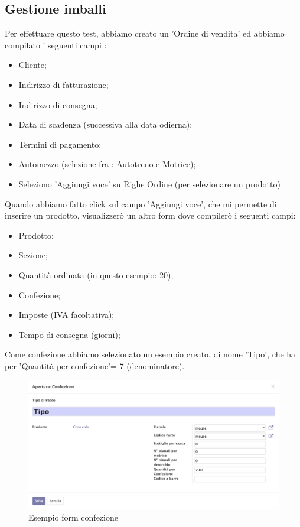 \subsection{Gestione imballi}

Per effettuare questo test, abbiamo creato un 'Ordine di vendita' ed abbiamo compilato i seguenti campi :
\begin{itemize}
	\item Cliente;
	\item Indirizzo di fatturazione;
	\item Indirizzo di consegna;
	\item Data di scadenza (successiva alla data odierna);
	\item Termini di pagamento;
	\item Automezzo (selezione fra : Autotreno e Motrice);
	\item Seleziono 'Aggiungi voce' su Righe Ordine (per selezionare un prodotto)
\end{itemize}

Quando abbiamo fatto click sul campo 'Aggiungi voce', che mi permette di inserire un prodotto, visualizzerò un altro form dove compilerò i seguenti campi:
\begin{itemize}
\item Prodotto;
\item Sezione;
\item Quantità ordinata (in questo esempio: 20);
\item Confezione;
\item Imposte (IVA facoltativa);
\item Tempo di consegna (giorni);
\end{itemize}

Come confezione abbiamo selezionato un esempio creato, di nome 'Tipo', che ha per 'Quantità per confezione'= 7 (denominatore).
\vspace*{1cm}
\begin{figure}[H]
	\begin{center} \includegraphics[scale=0.3]{figures/package}
		\caption[Esempio form confezione]{Esempio form confezione}
		\label{fig:package}
	\end{center}
\end{figure}


